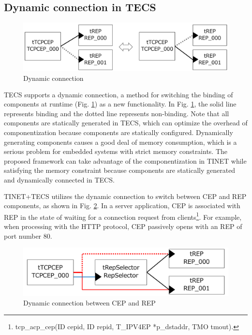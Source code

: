\documentclass[a4j,12pt,oneside,openany,english]{jsbook}
\begin{document}
\subsection{Dynamic connection in TECS}
\label{sec:DynamicConnection}

\begin{figure}[t]
    \centering
    \includegraphics[width=12cm,clip]{figure/DynamicConnection.pdf}
    \caption{Dynamic connection}
    \label{fig:DynamicConnection}
\end{figure}

TECS supports a dynamic connection, a method for switching the binding of components at runtime (Fig. \ref{fig:DynamicConnection}) as a new functionality.
In Fig. \ref{fig:DynamicConnection}, the solid line represents binding and the dotted line represents non-binding.
Note that all components are statically generated in TECS, which can optimize the overhead of componentization because components are statically configured.
Dynamically generating components causes a good deal of memory consumption, which is a serious problem for embedded systems with strict memory constraints.
The proposed framework can take advantage of the componentization in TINET while satisfying the memory constraint because components are statically generated and dynamically connected in TECS.

TINET+TECS utilizes the dynamic connection to switch between CEP and REP components, as shown in Fig. \ref{fig:DynamicConnectionUseCase}.
In a server application, CEP is associated with REP in the state of waiting for a connection request from clients\footnote{tcp\_acp\_cep(ID cepid, ID repid, T\_IPV4EP *p\_dstaddr, TMO tmout).}.
For example, when processing with the HTTP protocol, CEP passively opens with an REP of port number 80.

\begin{figure}[t]
    \centering
    \includegraphics[width=12cm,clip]{figure/DynamicConnectionUseCase.pdf}
    \caption{Dynamic connection between CEP and REP}
    \label{fig:DynamicConnectionUseCase}
\end{figure}
\end{document}
